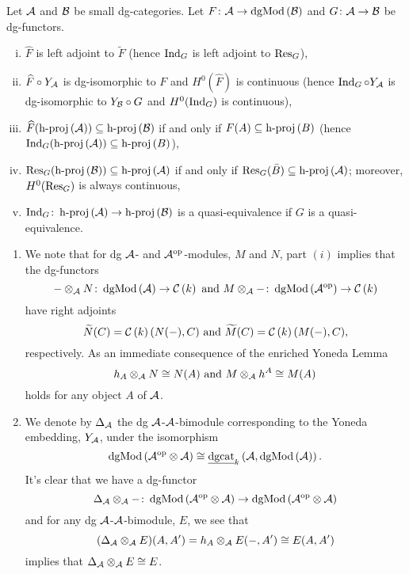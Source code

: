 \begin{proposition}[{\parencite[Prop 3.2]{CS15}}]
  Let \(\A\) and \(\B\) be small dg-categories.
  Let \(F \colon \A \to \dgMod{\B}\) and \(G \colon \A \to \B\) be dg-functors.
  \begin{enumerate}[(i)]
  \item
    \(\widehat{F}\) is left adjoint to \(\widetilde{F}\) (hence \(\Ind{G}\) is left adjoint to \(\Res{G}\)),
  \item
    \(\widehat{F} \circ Y_\A\) is dg-isomorphic to \(F\) and \(H^0(\widehat{F})\) is continuous (hence \(\Ind{G} \circ Y_\A\) is dg-isomorphic to \(Y_\B \circ G\) and \(H^0(\Ind{G})\) is continuous),
  \item
    \(\widehat{F}(\hproj{\A}) \subseteq \hproj{\B}\) if and only if \(F(A) \subseteq \hproj{B}\) (hence \(\Ind{G}(\hproj{\A}) \subseteq \hproj{B}\)),
  \item
    \(\Res{G}(\hproj{\B}) \subseteq \hproj{\A}\) if and only if \(\Res{G}(\bar{B}) \subseteq \hproj{\A}\); moreover,\\ \(H^0(\Res{G})\) is always continuous,
  \item
    \(\Ind{G} \colon \hproj{\A} \to \hproj{\B}\) is a quasi-equivalence if \(G\) is a quasi-equivalence.
  \end{enumerate}
\end{proposition}

\begin{remark}\label{rem: tensoring with reps}
  \begin{enumerate}
  \item
    We note that for dg \(\A\)- and \(\A^\opp\)-modules, \(M\) and \(N\), part \((i)\) implies that the dg-functors
    \[- \otimes_\A N \colon \dgMod{\A} \to \CH{k}\ \text{and}\ M \otimes_\A - \colon \dgMod{\A^\opp} \to \CH{k}\]
    have right adjoints
    \[\widetilde{N}(C) = \CH{k}(N( - ), C)\ \text{and}\ \widetilde{M}(C) = \CH{k}(M( - ), C),\]
    respectively.
    As an immediate consequence of the enriched Yoneda Lemma
    \[h_A \otimes_\A N \cong N(A)\ \text{and}\ M \otimes_\A h^A \cong M(A)\]
    holds for any object \(A\) of \(\A\).
  \item
    We denote by \(\Delta_\A\) the dg \(\A\)-\(\A\)-bimodule corresponding to the Yoneda embedding, \(Y_\A\), under the isomorphism
    \[\dgMod{\A^\opp \otimes \A} \cong \DGCAT{k}\left(\A, \dgMod{\A}\right).\]
    It's clear that we have a dg-functor
    \[\Delta_\A \otimes_\A - \colon \dgMod{\A^\opp \otimes \A} \to \dgMod{\A^\opp \otimes \A}\]
    and for any dg \(\A\)-\(\A\)-bimodule, \(E\), we see that
    \[(\Delta_\A \otimes_\A E)(A,A^\prime) = h_A \otimes_\A E(- , A^\prime) \cong E(A,A^\prime)\]
    implies that \(\Delta_\A \otimes_\A E \cong E\).
  \end{enumerate}
\end{remark}

